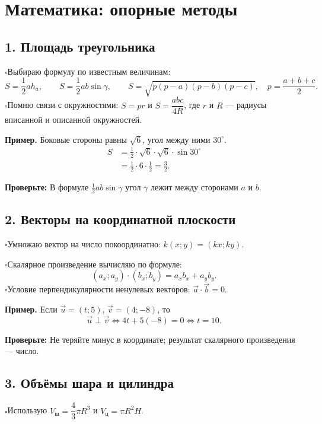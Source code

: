 \documentclass[a4paper,12pt]{article}
\newcommand{\ck}{\(\square\)\enspace}
\newcommand{\topic}[1]{\needspace{5\baselineskip}\subsection*{\color{darkaccent}#1}}
\newcommand{\tip}[1]{\par\textcolor{darkaccent}{\textbf{Проверьте:}} #1\par}
\begin{document}
\section*{\color{darkaccent}Математика: опорные методы}
\topic{1. Площадь треугольника}
\ck Выбираю формулу по известным величинам:
\[
S=\frac12 ah_a,\qquad S=\frac12 ab\sin\gamma,\qquad
S=\sqrt{p(p-a)(p-b)(p-c)},\quad p=\frac{a+b+c}{2}.
\]
\ck Помню связи с окружностями: $S=pr$ и $S=\dfrac{abc}{4R}$, где $r$ и $R$ --- радиусы вписанной и описанной окружностей.
\par\medskip
\begin{minipage}[c]{0.54\linewidth}
\textbf{Пример.} Боковые стороны равны $\sqrt6$, угол между ними $30^\circ$.
\[
\begin{aligned}
S&=\frac12\cdot\sqrt6\cdot\sqrt6\cdot\sin30^\circ\\
 &=\frac12\cdot6\cdot\frac12=\boxed{\frac32}.
\end{aligned}
\]
\end{minipage}\hfill
\begin{minipage}[c]{0.40\linewidth}
\begin{center}
\end{center}
\end{minipage}
\par
\tip{В формуле $\tfrac12 ab\sin\gamma$ угол $\gamma$ лежит между сторонами $a$ и $b$.}

\topic{2. Векторы на координатной плоскости}
\ck Умножаю вектор на число покоординатно: $k(x;y)=(kx;ky)$.

\ck Скалярное произведение вычисляю по формуле:
\[
(a_x;a_y)\cdot(b_x;b_y)=a_xb_x+a_yb_y.
\]
\ck Условие перпендикулярности ненулевых векторов: $\vec a\cdot\vec b=0$.

\textbf{Пример.} Если $\vec u=(t;5)$, $\vec v=(4;-8)$, то
\[
\vec u\perp\vec v\iff 4t+5(-8)=0\iff \boxed{t=10}.
\]
\tip{Не теряйте минус в координате; результат скалярного произведения --- число.}

\topic{3. Объёмы шара и цилиндра}
\ck Использую $V_{\text{ш}}=\dfrac43\pi R^3$ и $V_{\text{ц}}=\pi R^2H$.
\end{document}
